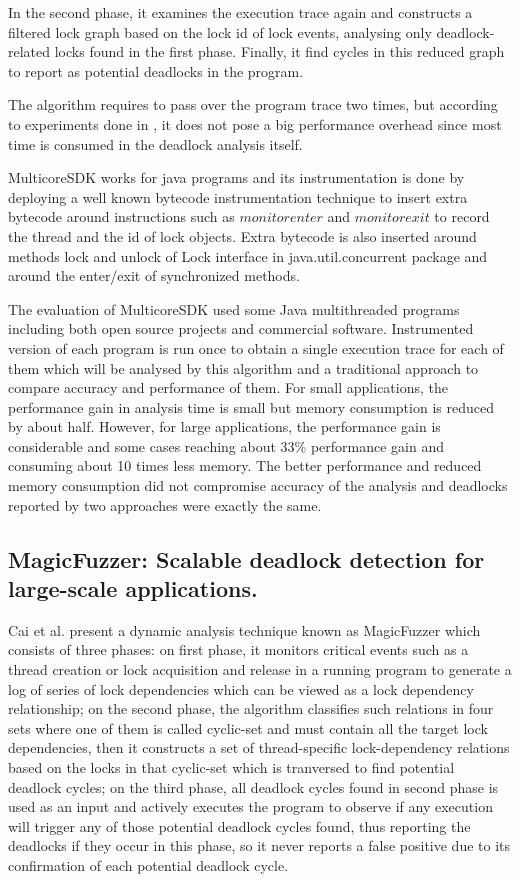 In the second phase, it examines the execution trace again and constructs a filtered lock graph based on the lock id of lock events, analysing only deadlock-related locks
found in the first phase. Finally, it find cycles in this reduced graph to report as potential deadlocks in the program.

The algorithm requires to pass over the program trace two times, but according to experiments done in \cite{mcsdk}, it does not pose a big performance overhead since
most time is consumed in the deadlock analysis itself.

MulticoreSDK works for java programs and its instrumentation is done by deploying a well known bytecode instrumentation technique \cite{tanter} to insert extra bytecode around instructions such as $monitorenter$ and $monitorexit$
to record the thread and the id of lock objects. Extra bytecode is also inserted around methods lock and unlock of Lock interface in java.util.concurrent package and around the enter/exit of
synchronized methods.

The evaluation of MulticoreSDK used some Java multithreaded programs including both open source projects and commercial software. Instrumented version of each program is run
once to obtain a single execution trace for each of them which will be analysed by this algorithm and a traditional approach \cite{contest} to compare accuracy and performance of them.
For small applications, the performance gain in analysis time is small but memory consumption is reduced by about half. However, for large applications, the performance gain is considerable and
some cases reaching about 33\% performance gain and consuming about 10 times less memory. The better performance and reduced memory consumption did not compromise accuracy of the analysis and
deadlocks reported by two approaches were exactly the same.

\subsection{MagicFuzzer: Scalable deadlock detection for large-scale applications.} Cai et al. \cite{magicfuzzer}
present a dynamic analysis technique known as MagicFuzzer which consists of three phases: on first phase, it monitors critical events such as a thread
creation or lock acquisition and release in a running program to generate a log of series of lock dependencies which can be viewed as a lock dependency relationship; on the second phase,
the algorithm classifies such relations in four sets where one of them is called cyclic-set and must contain all the target lock dependencies, then it constructs
a set of thread-specific lock-dependency relations based on the locks in that cyclic-set which is tranversed to find potential deadlock cycles; on the third phase,
all deadlock cycles found in second phase is used as an input and actively executes the program to observe if any execution will trigger any of those potential deadlock cycles
found, thus reporting the deadlocks if they occur in this phase, so it never reports a false positive due to its confirmation of each potential deadlock cycle.

